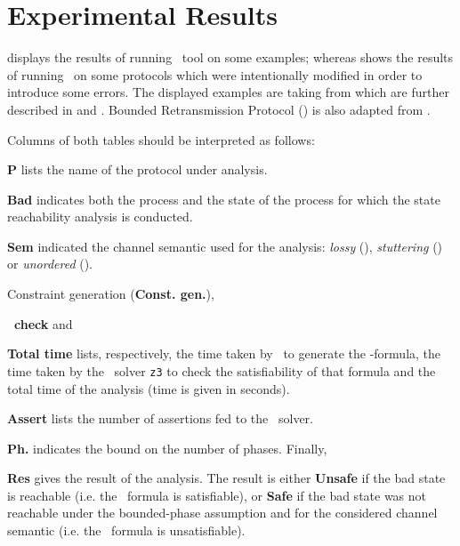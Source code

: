 \section{Experimental Results}

 displays the results of running \MPass\ tool on  some examples;
whereas  shows the results of running \MPass\ on some protocols which were intentionally modified in order to introduce some errors.
%
The displayed  examples are   taking  from \cite{JRSVgit}  which are further described in \cite{MPSV11} and \cite{RSV11}.
%
Bounded Retransmission Protocol (\Brp) is also adapted from \cite{AABJ04}.


Columns of both tables should be interpreted as follows:
%
\begin{inparaenum}
\item {\bf P} lists the name of the protocol under analysis.
\item {\bf Bad} indicates both the process and the state of the process for which the state reachability analysis is conducted.
\item {\bf Sem} indicated the channel semantic used for the analysis: \textit{lossy} (\Lcs), \textit{stuttering} (\Slcs) or \textit{unordered} (\Ucs).
\item Constraint generation (\textbf{Const. gen.}),
\item \textbf{\Smt\ check} and
\item {\bf Total time} lists, respectively, the time taken by \MPass\ to generate  the \Smt-formula,
the time taken by the \Smt\ solver \texttt{z3} to check the satisfiability of that formula and the total time of the analysis
(time is given in seconds).
\item {\bf Assert} lists the number of assertions fed to the \Smt\ solver.
\item {\bf Ph.} indicates the bound on the number of phases. Finally,
\item {\bf Res} gives the result of the analysis. The result is either \textbf{Unsafe} if the bad state is reachable (i.e. the \Smt\ formula is satisfiable), or
\textbf{Safe}  if the bad state was not reachable under the bounded-phase assumption and for the considered channel semantic
(i.e. the \Smt\ formula is unsatisfiable).
\end{inparaenum}

